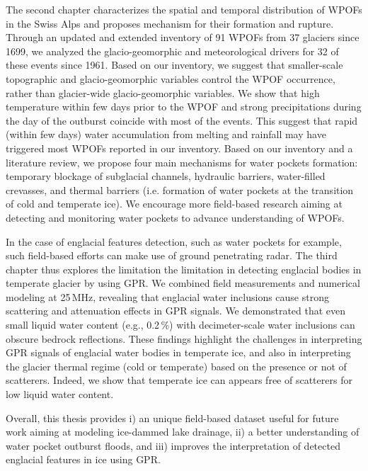 The second chapter characterizes the spatial and temporal distribution of WPOFs in the Swiss Alps and proposes mechanism for their formation and rupture. Through an updated and extended inventory of 91 WPOFs from 37 glaciers since 1699, we analyzed the glacio-geomorphic and meteorological drivers for 32 of these events since 1961. Based on our inventory, we suggest that smaller-scale topographic and glacio-geomorphic variables control the WPOF occurrence, rather than glacier-wide glacio-geomorphic variables. We show that high temperature within few days prior to the WPOF and strong precipitations during the day of the outburst coincide with most of the events. This suggest that rapid (within few days) water accumulation from melting and rainfall may have triggered most WPOFs reported in our inventory. Based on our inventory and a literature review, we propose four main mechanisms for water pockets formation: temporary blockage of subglacial channels, hydraulic barriers, water-filled crevasses, and thermal barriers (i.e. formation of water pockets at the transition of cold and temperate ice). We encourage more field-based research aiming at detecting and monitoring water pockets to advance understanding of WPOFs.
%

In the case of englacial features detection, such as water pockets for example, such field-based efforts can make use of ground penetrating radar. The third chapter thus explores the limitation the limitation in detecting englacial bodies in temperate glacier by using GPR. We combined field measurements and numerical modeling at 25\,MHz, revealing that englacial water inclusions cause strong scattering and attenuation effects in GPR signals. We demonstrated that even small liquid water content (e.g., 0.2\,\%) with decimeter-scale water inclusions can obscure bedrock reflections. These findings highlight the challenges in interpreting GPR signals of englacial water bodies in temperate ice, and also in interpreting the glacier thermal regime (cold or temperate) based on the presence or not of scatterers. Indeed, we show that temperate ice can appears free of scatterers for low liquid water content.
%

Overall, this thesis provides i) an unique field-based dataset useful for future work aiming at modeling ice-dammed lake drainage, ii) a better understanding of water pocket outburst floods, and iii) improves the interpretation of detected englacial features in ice using GPR.



\endgroup

